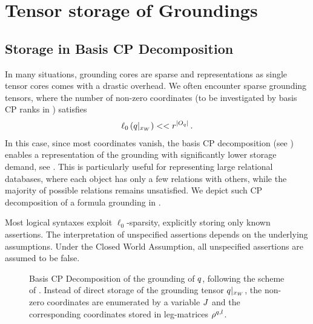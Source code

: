 \section{Tensor storage of Groundings}\label{sec:groundingStorage}


\subsection{Storage in Basis CP Decomposition}\label{sec:basisCPgrounding}

In many situations, grounding cores are sparse and representations as single tensor cores comes with a drastic overhead.
We often encounter sparse grounding tensors, where the number of non-zero coordinates (to be investigated by basis CP ranks in ) satisfies
\begin{align*}
    \ell_0\left({q}|_{x_{W}}\right) << r^{\left|O_{q}\right|} \, .
\end{align*}
In this case, since most coordinates vanish, the basis CP decomposition (see ) enables a representation of the grounding with significantly lower storage demand, see .
This is particularly useful for representing large relational databases, where each object has only a few relations with others, while the majority of possible relations remains unsatisfied.
We depict such CP decomposition of a formula grounding in .

Most logical syntaxes exploit $\ell_0$-sparsity, explicitly storing only known assertions.
The interpretation of unspecified assertions depends on the underlying assumptions.
Under the Closed World Assumption, all unspecified assertions are assumed to be false.

%



\begin{figure}[t]
    \begin{center}
        
    \end{center}
    \caption{Basis CP Decomposition of the grounding of $q$, following the scheme of .
    Instead of direct storage of the grounding tensor ${q}|_{x_{W}}$, the non-zero coordinates are enumerated by a variable $J$ and the corresponding coordinates stored in leg-matrices $\rho^{q,l}$.}
    \label{fig:groundingCP}
\end{figure}



